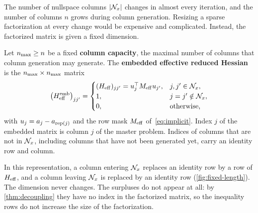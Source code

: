 The number of nullspace columns $|\mathcal{N}_x|$ changes in almost every iteration, and the number of
columns $n$ grows during column generation. Resizing a sparse factorization at every change
would be expensive and complicated. Instead, the factorized matrix is given a fixed dimension.

\begin{definition} \label{def:fixed-length}
Let $n_{\max}\ge n$ be a fixed \textbf{column capacity}, the maximal number of columns that column
generation may generate. The \textbf{embedded effective reduced Hessian} is the
$n_{\max}\times n_{\max}$ matrix
\[
\bigl(H_{\mathrm{eff}}^{\mathrm{emb}}\bigr)_{jj'} =
\begin{cases}
(H_{\mathrm{eff}})_{jj'} = u_j^\top M_{\mathrm{eff}} u_{j'}, & j,j'\in\mathcal{N}_x,\\
1, & j = j'\notin\mathcal{N}_x,\\
0, & \text{otherwise,}
\end{cases}
\]
with $u_j = a_j - a_{\operatorname{rep}(j)}$ and the row mask $M_{\mathrm{eff}}$ of~\eqref{eq:implicit}. Index $j$ of
the embedded matrix is column $j$ of the master problem. Indices of columns that are not in
$\mathcal{N}_x$, including columns that have not been generated yet, carry an identity row and column.
\end{definition}

In this representation, a column entering $\mathcal{N}_x$ replaces an identity row by a row of $H_{\mathrm{eff}}$,
and a column leaving $\mathcal{N}_x$ is replaced by an identity row (\cref{fig:fixed-length}). The
dimension never changes. The surpluses do not appear at all: by \cref{thm:decoupling} they
have no index in the factorized matrix, so the inequality rows do not increase the size of
the factorization.

